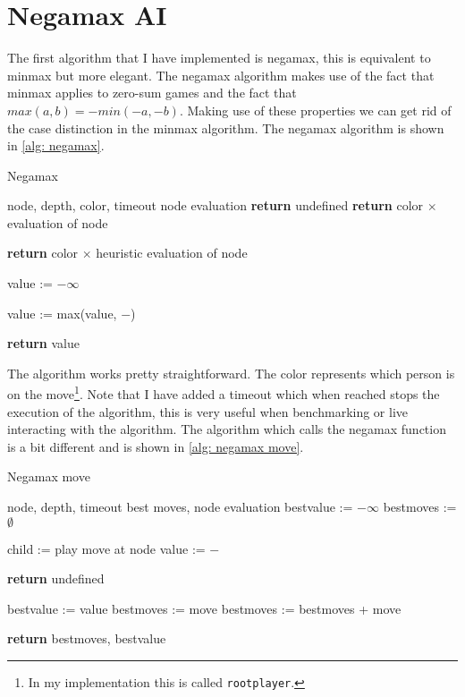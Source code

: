\documentclass[a4paper]{article}
\begin{document}
\section{Negamax AI}

The first algorithm that I have implemented is negamax, this is equivalent to
minmax but more elegant. The negamax algorithm makes use of the fact that
minmax applies to zero-sum games and the fact that $max(a, b) = -min(-a, -b)$.
Making use of these properties we can get rid of the case distinction in
the minmax algorithm. The negamax algorithm is shown in \ref{alg: negamax}.

\begin{algorithm}
	\caption{Negamax}
	\label{alg: negamax}
	\begin{algorithmic}[1]
		\Require node, depth, color, timeout
		\Ensure node evaluation
				\State \textbf{return} undefined
			\EndIf
				\State \textbf{return} color $\times$ evaluation of node
			\EndIf

				\State \textbf{return} color $\times$ heuristic evaluation of node
			\EndIf

			\State value := $-\infty$

				\State value := max(value, $-$)
			\EndFor

			\State \textbf{return} value
		\EndFunction
	\end{algorithmic}
\end{algorithm}

The algorithm works pretty straightforward. The color represents which person
is on the move\footnote{In my implementation this is called
\texttt{rootplayer}.}. Note that I have added a timeout which when reached
stops the execution of the algorithm, this is very useful when benchmarking or
live interacting with the algorithm. The algorithm which calls the negamax
function is a bit different and is shown in \ref{alg: negamax move}.

\begin{algorithm}
	\caption{Negamax move}
	\label{alg: negamax move}
	\begin{algorithmic}[1]
		\Require node, depth, timeout
		\Ensure best moves, node evaluation
			\State bestvalue := $-\infty$
			\State bestmoves := $\emptyset$

				\State child := play move at node
				\State value := $-$

					\State \textbf{return} undefined
				\EndIf

					\State bestvalue := value
					\State bestmoves := move
					\State bestmoves := bestmoves + move
				\EndIf
			\EndFor

			\State \textbf{return} bestmoves, bestvalue
		\EndFunction
	\end{algorithmic}
\end{algorithm}
\end{document}
